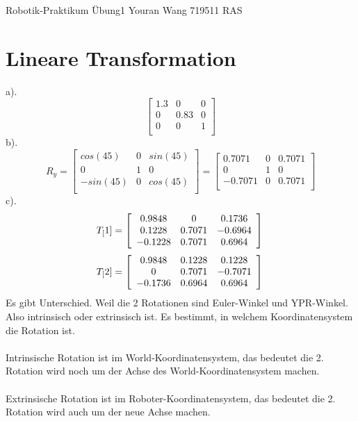 \documentclass{article}
\begin{document}
\Large
Robotik-Praktikum Übung1
\large
Youran Wang 719511 RAS


\section{Lineare Transformation}
a).
\[
\left[ \begin{array}{ccc}
    1.3  &  0       & 0  \\
    0 &  0.83 &  0 \\
    0 &  0 &  1  \\
\end{array}
\right]
\]
b).
\[
R_{y}= \left[ \begin{array}{ccc}
    cos(45) &  0       & sin(45)  \\
    0 &  1 &  0 \\
    -sin(45) &  0 &  cos(45)  \\
\end{array}\right] = \left[ \begin{array}{ccc}
    0.7071 &  0       & 0.7071  \\
    0 &  1 &  0 \\
    -0.7071 &  0 &  0.7071 \\
\end{array}
\right]
\]
c).
\[
 T_[1]=\left[ \begin{array}{ccc}
    0.9848  &  0       & 0.1736 \\
    0.1228  &  0.7071  & -0.6964 \\
    -0.1228 &  0.7071  & 0.6964  \\
\end{array}\right]\\
\]\[
T_[2]=\left[ \begin{array}{ccc}
    0.9848  &  0.1228  & 0.1228 \\
    0       &  0.7071  & -0.7071 \\
    -0.1736 &  0.6964  & 0.6964  \\
\end{array}\right]\\
\]
Es gibt Unterschied. Weil die 2 Rotationen sind Euler-Winkel und YPR-Winkel. Also intrinsisch oder extrinsisch ist. Es bestimmt, in welchem Koordinatensystem die Rotation ist.
\\
\\
Intrinsische Rotation ist im World-Koordinatensystem, das bedeutet die 2. Rotation wird noch um der Achse des World-Koordinatensystem machen.
\\
\\
Extrinsische Rotation ist im Roboter-Koordinatensystem, das bedeutet die 2. Rotation wird auch um der neue Achse machen.
\end{document}
